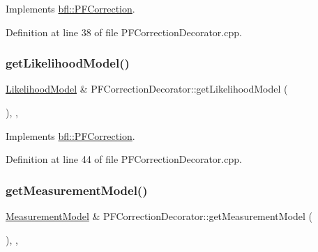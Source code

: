 Implements \mbox{\hyperlink{classbfl_1_1PFCorrection_ab6eca766077c4ab1db3417dab6c44d27}{bfl\+::\+P\+F\+Correction}}.



Definition at line 38 of file P\+F\+Correction\+Decorator.\+cpp.

\mbox{\label{classbfl_1_1PFCorrectionDecorator_ae58be7d0fedf9b56afb994211fb4ee6a}} 
\subsubsection{\texorpdfstring{get\+Likelihood\+Model()}{getLikelihoodModel()}}
{\footnotesize\ttfamily \mbox{\hyperlink{classbfl_1_1LikelihoodModel}{Likelihood\+Model}} \& P\+F\+Correction\+Decorator\+::get\+Likelihood\+Model (\begin{DoxyParamCaption}{ }\end{DoxyParamCaption})\hspace{0.3cm}{\ttfamily [override]}, {\ttfamily [protected]}, {\ttfamily [virtual]}}



Implements \mbox{\hyperlink{classbfl_1_1PFCorrection_ad812d0b488e0882b246dd19d4f6818e1}{bfl\+::\+P\+F\+Correction}}.



Definition at line 44 of file P\+F\+Correction\+Decorator.\+cpp.

\mbox{\label{classbfl_1_1PFCorrectionDecorator_a3d5b289a95cf6623922153b469755e80}} 
\subsubsection{\texorpdfstring{get\+Measurement\+Model()}{getMeasurementModel()}}
{\footnotesize\ttfamily \mbox{\hyperlink{classbfl_1_1MeasurementModel}{Measurement\+Model}} \& P\+F\+Correction\+Decorator\+::get\+Measurement\+Model (\begin{DoxyParamCaption}{ }\end{DoxyParamCaption})\hspace{0.3cm}{\ttfamily [override]}, {\ttfamily [protected]}, {\ttfamily [virtual]}}



